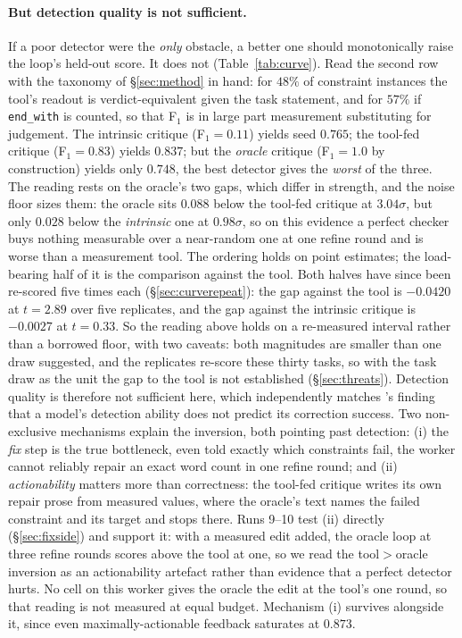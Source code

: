 \documentclass[11pt]{article}
\begin{document}
\paragraph{But detection quality is not sufficient.} If a poor detector were the \emph{only} obstacle, a better
one should monotonically raise the loop's held-out score. It does not
(Table~\ref{tab:curve}). Read the second row with the taxonomy of
\S\ref{sec:method} in hand: for $48\%$ of constraint instances the tool's readout is
verdict-equivalent given the task statement, and for $57\%$ if \texttt{end\_with} is counted, so
that F$_1$ is in large part measurement substituting for judgement. The intrinsic critique (F$_1\!=\!0.11$) yields seed
$0.765$; the tool-fed critique (F$_1\!=\!0.83$) yields $0.837$; but the
\emph{oracle} critique (F$_1\!=\!1.0$ by construction) yields only $0.748$, the
best detector gives the \emph{worst} of the three. The reading rests on the oracle's two gaps,
which differ in strength, and the noise floor sizes them: the oracle sits
$0.088$ below the tool-fed critique at $3.04\sigma$, but only $0.028$ below the
\emph{intrinsic} one at $0.98\sigma$, so on this evidence a perfect checker buys
nothing measurable over a near-random one at one refine round and is worse than a measurement
tool. The
ordering holds on point estimates; the load-bearing half of it is the comparison against the
tool. Both halves have since been re-scored five times each (\S\ref{sec:curverepeat}): the gap
against the tool is $-0.0420$ at $t = 2.89$ over five replicates, and the gap against the intrinsic
critique is $-0.0027$ at $t = 0.33$. So the reading above holds on a re-measured interval
rather than a borrowed floor, with two caveats: both magnitudes are smaller than one draw
suggested, and the replicates re-score these thirty tasks, so with the task draw as the unit the
gap to the tool is not established (\S\ref{sec:threats}). Detection quality is therefore not sufficient here, which independently matches
\citet{decomposing2026selfcorrection}'s finding that a model's detection ability does not
predict its correction success. Two non-exclusive mechanisms explain the inversion,
both pointing past detection: (i) the \emph{fix} step is the true bottleneck,
even told exactly which constraints fail, the worker cannot reliably repair an exact
word count in one refine round; and (ii) \emph{actionability} matters more than
correctness: the tool-fed critique writes its own repair prose from measured values, where the
oracle's text names the failed constraint and its target and stops there. Runs 9--10 test (ii)
directly (\S\ref{sec:fixside}) and support
it: with a measured edit added, the oracle loop at three refine rounds scores above the tool at
one, so we read the tool${>}$oracle inversion as an actionability artefact rather
than evidence that a perfect detector hurts. No cell on this worker gives the oracle the edit at
the tool's one round, so that reading is not measured at equal budget. Mechanism (i) survives alongside it,
since even maximally-actionable feedback saturates at $0.873$.
\end{document}
